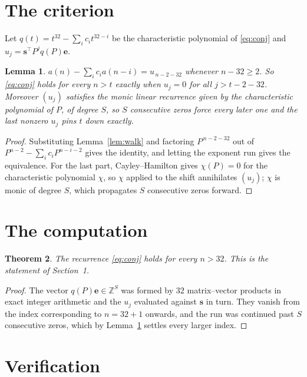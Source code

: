 \documentclass[11pt,a4paper]{article}
\theoremstyle{plain}
\newtheorem{theorem}{Theorem}
\newtheorem{lemma}[theorem]{Lemma}
\theoremstyle{definition}
\begin{document}
\section{The criterion}

Let $q(t)=t^{32}-\sum_i c_i t^{32-i}$ be the characteristic polynomial of
\eqref{eq:conj} and $u_j=\mathbf{s}^{\!\top}P^{j}q(P)\mathbf{e}$.

\begin{lemma}\label{lem:crit}
$a(n)-\sum_i c_i a(n-i)=u_{\,n-2-32}$ whenever $n-32\ge2$. So \eqref{eq:conj}
holds for every $n>t$ exactly when $u_j=0$ for all $j>t-2-32$. Moreover $(u_j)$
satisfies the monic linear recurrence given by the characteristic polynomial of $P$, of
degree $S$, so $S$ consecutive zeros force every later one and the last nonzero $u_j$ pins
$t$ down exactly.
\end{lemma}

\begin{proof}
Substituting Lemma~\ref{lem:walk} and factoring $P^{\,n-2-32}$ out of
$P^{n-2}-\sum_i c_i P^{n-i-2}$ gives the identity, and letting the exponent run gives the
equivalence. For the last part, Cayley--Hamilton gives $\chi(P)=0$ for the characteristic
polynomial $\chi$, so $\chi$ applied to the shift annihilates $(u_j)$; $\chi$ is monic of
degree $S$, which propagates $S$ consecutive zeros forward.
\end{proof}

\section{The computation}

\begin{theorem}
The recurrence \eqref{eq:conj} holds for every $n>32$. This is the statement of
Section~1.
\end{theorem}

\begin{proof}
The vector $q(P)\mathbf{e}\in\mathbb{Z}^{S}$ was formed by $32$ matrix--vector
products in exact integer arithmetic and the $u_j$ evaluated against $\mathbf{s}$ in turn.
They vanish from the index corresponding to $n=32+1$ onwards, and the run was continued
past $S$ consecutive zeros, which by Lemma~\ref{lem:crit} settles every larger index.
\end{proof}

\section{Verification}
\end{document}
